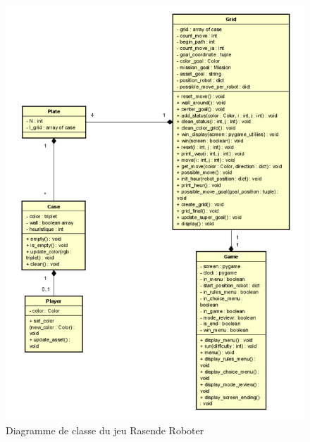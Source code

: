 \documentclass{article}
\begin{document}
\begin{figure}
  \centering  
  \includegraphics[width=1\textwidth]{diagram_class.png}  
  \caption{Diagramme de classe du jeu Rasende Roboter} 
  \label{fig:Diagram}  
\end{figure}\\
\end{document}
